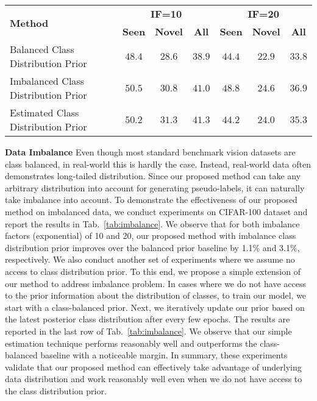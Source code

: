 \documentclass[runningheads]{eccv2022submission}
\begin{document}
\begin{table*}[t]
\caption{Performance on \textbf{CIFAR-100} dataset with different imabalance factors (\textbf{IF}) with 50\% classes as seen and 50\% classes as novel.}
\begin{center}
\small
\begin{tabular}{lccc|ccc}
\hline



\multicolumn{1}{l}{\multirow{2}{*}{\textbf{Method}}} &
 \multicolumn{3}{c|}{\textbf{IF=10}} & \multicolumn{3}{c}{\textbf{IF=20}}\\  
\multicolumn{1}{c}{} & \textbf{Seen} & \textbf{Novel} & \textbf{All} & \textbf{Seen} & \textbf{Novel} & \textbf{All}\\




\hline
Balanced Class Distribution Prior & $48.4$ & $28.6$ & $38.9$ & $44.4$ & $22.9$ & $33.8$\\
Imbalanced Class Distribution Prior & $50.5$ & $30.8$ & $41.0$ & $48.8$ & $24.6$ & $36.9$\\
Estimated Class Distribution Prior & $50.2$ & $31.3$ & $41.3$ & $44.2$ & $24.0$ & $35.3$\\
\hline 



\end{tabular}
\end{center}
\vspace{-4mm}
\label{tab:imbalance}
\vspace{-3mm}
\end{table*}
\vspace{1mm}
\label{par:data_imbalance}
\noindent \textbf{Data Imbalance} Even though most standard benchmark vision datasets are class balanced, in real-world this is hardly the case. Instead, real-world data often demonstrates long-tailed distribution. Since our proposed method can take any arbitrary distribution into account for generating pseudo-labels, it can naturally take imbalance into account. To demonstrate the effectiveness of our proposed method on imbalanced data, we conduct experiments on CIFAR-100 dataset and report the results in Tab.~\ref{tab:imbalance}. We observe that for both imbalance factors (exponential) of 10 and 20, our proposed method with imbalance class distribution prior improves over the balanced prior baseline by 1.1\% and 3.1\%, respectively. We also conduct another set of experiments where we assume no access to class distribution prior. 
To this end, we propose a simple extension of our method to address imbalance problem. In cases where we do not have access to the prior information about the distribution of classes, to train our model, we start with a class-balanced prior. Next, we iteratively update our prior based on the latest posterior class distribution after every few epochs. The results are reported in the last row of Tab.~\ref{tab:imbalance}. We observe that our simple estimation technique performs reasonably well and outperforms the class-balanced baseline with a noticeable margin. In summary, these experiments validate that our proposed method can effectively take advantage of underlying data distribution and work reasonably well even when we do not have access to the class distribution prior.      
\end{document}
